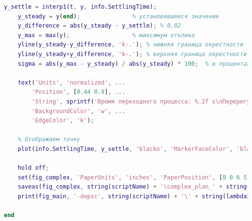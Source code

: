 \documentclass[a4paper]{article}
\begin{document}
\begin{lstlisting}[caption={Код для построения графиков для задания 2}, language=matlab]
    y_settle = interp1(t, y, info.SettlingTime);
    y_steady = y(end);               % установившееся значение
    y_difference = abs(y_steady - y_settle); % 0.02
    y_max = max(y);                  % максимум отклика
    yline(y_steady-y_difference, 'k-.'); % нижняя граница окрестности
    yline(y_steady+y_difference, 'k-.'); % верхняя граница окрестности
    sigma = abs(y_max - y_steady) / abs(y_steady) * 100;  % в процентах

    text('Units', 'normalized', ...
        'Position', [0.44 0.9], ...
        'String', sprintf('Время переходного процесса: %.2f s\nПеререгулирование: %.2f%%', info.SettlingTime, sigma), ...
        'BackgroundColor', 'w', ...
        'EdgeColor', 'k');

    % Отображаем точку
    plot(info.SettlingTime, y_settle, 'blacko', 'MarkerFaceColor', 'black', 'MarkerSize', 4);
    
    hold off;
    set(fig_complex, 'PaperUnits', 'inches', 'PaperPosition', [0 0 6 5]);
    saveas(fig_complex, string(scriptName) + '\complex_plan_' + string(lambda1) + '_' + string(lambda2) + '_' + string(lambda3) + '.eps', 'epsc')
    print(fig_main, '-depsc', string(scriptName) + '\' + string(lambda1) + '_' + string(lambda2) + '_' + string(lambda3) + '.eps')
    
end
\end{lstlisting}
\end{document}
